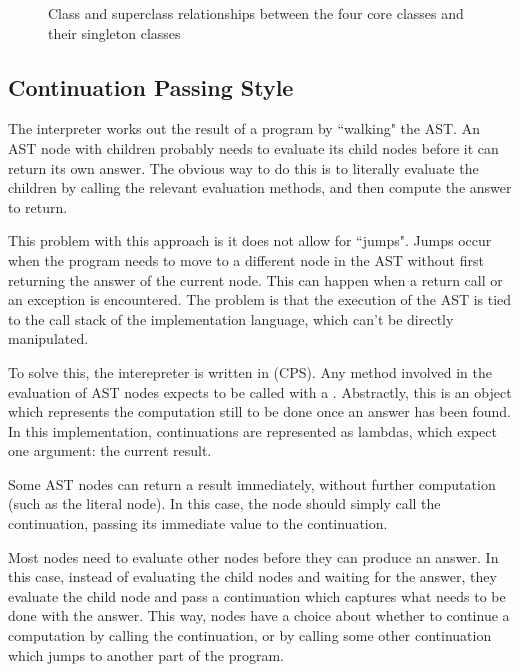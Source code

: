 \begin{figure}
\begin{center}
\caption{Class and superclass relationships between the four core classes and their singleton classes}
\label{fig:core_relationships}
\end{center}
\end{figure}

\subsection{Continuation Passing Style}

The interpreter works out the result of a program by ``walking" the AST. An AST node with children probably needs to evaluate its child nodes before it can return its own answer. The obvious way to do this is to literally evaluate the children by calling the relevant evaluation methods, and then compute the answer to return.

This problem with this approach is it does not allow for ``jumps". Jumps occur when the program needs to move to a different node in the AST without first returning the answer of the current node. This can happen when a return call or an exception is encountered. The problem is that the execution of the AST is tied to the call stack of the implementation language, which can't be directly manipulated.

To solve this, the interepreter is written in  (CPS). Any method involved in the evaluation of AST nodes expects to be called with a . Abstractly, this is an object which represents the computation still to be done once an answer has been found. In this implementation, continuations are represented as lambdas, which expect one argument: the current result.

Some AST nodes can return a result immediately, without further computation (such as the literal  node). In this case, the node should simply call the continuation, passing its immediate value to the continuation.

Most nodes need to evaluate other nodes before they can produce an answer. In this case, instead of evaluating the child nodes and waiting for the answer, they evaluate the child node and pass a continuation which captures what needs to be done with the answer. This way, nodes have a choice about whether to continue a computation by calling the continuation, or by calling some other continuation which jumps to another part of the program.

